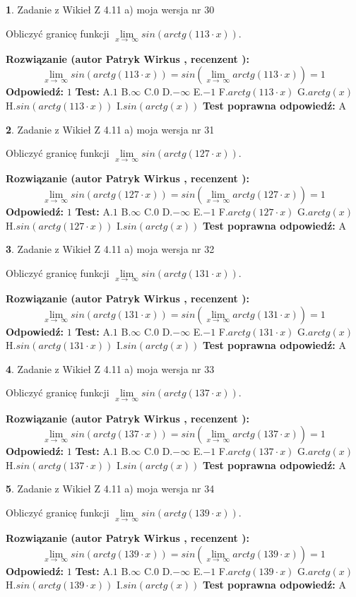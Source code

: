\documentclass[12pt, a4paper]{article}
\theoremstyle{definition} %
\newtheorem{zad}{}
\newcommand{\zadStart}[1]{\begin{zad}#1\newline}
\newcommand{\zadStop}{\end{zad}}
\newcommand{\rozwStart}[2]{\noindent \textbf{Rozwiązanie (autor #1 , recenzent #2): }\newline}
\newcommand{\rozwStop}{\newline}
\newcommand{\odpStart}{\noindent \textbf{Odpowiedź:}\newline}
\newcommand{\odpStop}{\newline}
\newcommand{\testStart}{\noindent \textbf{Test:}\newline}
\newcommand{\testStop}{\newline}
\newcommand{\kluczStart}{\noindent \textbf{Test poprawna odpowiedź:}\newline}
\newcommand{\kluczStop}{\newline}
\begin{document}
\zadStart{Zadanie z Wikieł Z 4.11 a) moja wersja nr 30}

Obliczyć granicę funkcji  $\lim\limits_{x\to\ \infty}sin(arctg(113\cdot x))$.
\zadStop
\rozwStart{Patryk Wirkus}{}
$$\lim\limits_{x\to\ \infty}sin(arctg(113\cdot x)) = sin(\lim\limits_{x\to\ \infty}arctg(113\cdot x)) = 1$$
\rozwStop
\odpStart
$1$
\odpStop
\testStart
A.$1$ B.$\infty$ C.$0$ D.$-\infty$ E.$-1$
F.$arctg(113\cdot x)$ G.$arctg(x)$
H.$sin(arctg(113\cdot x))$
I.$sin(arctg(x))$
\testStop
\kluczStart
A
\kluczStop



\zadStart{Zadanie z Wikieł Z 4.11 a) moja wersja nr 31}

Obliczyć granicę funkcji  $\lim\limits_{x\to\ \infty}sin(arctg(127\cdot x))$.
\zadStop
\rozwStart{Patryk Wirkus}{}
$$\lim\limits_{x\to\ \infty}sin(arctg(127\cdot x)) = sin(\lim\limits_{x\to\ \infty}arctg(127\cdot x)) = 1$$
\rozwStop
\odpStart
$1$
\odpStop
\testStart
A.$1$ B.$\infty$ C.$0$ D.$-\infty$ E.$-1$
F.$arctg(127\cdot x)$ G.$arctg(x)$
H.$sin(arctg(127\cdot x))$
I.$sin(arctg(x))$
\testStop
\kluczStart
A
\kluczStop



\zadStart{Zadanie z Wikieł Z 4.11 a) moja wersja nr 32}

Obliczyć granicę funkcji  $\lim\limits_{x\to\ \infty}sin(arctg(131\cdot x))$.
\zadStop
\rozwStart{Patryk Wirkus}{}
$$\lim\limits_{x\to\ \infty}sin(arctg(131\cdot x)) = sin(\lim\limits_{x\to\ \infty}arctg(131\cdot x)) = 1$$
\rozwStop
\odpStart
$1$
\odpStop
\testStart
A.$1$ B.$\infty$ C.$0$ D.$-\infty$ E.$-1$
F.$arctg(131\cdot x)$ G.$arctg(x)$
H.$sin(arctg(131\cdot x))$
I.$sin(arctg(x))$
\testStop
\kluczStart
A
\kluczStop



\zadStart{Zadanie z Wikieł Z 4.11 a) moja wersja nr 33}

Obliczyć granicę funkcji  $\lim\limits_{x\to\ \infty}sin(arctg(137\cdot x))$.
\zadStop
\rozwStart{Patryk Wirkus}{}
$$\lim\limits_{x\to\ \infty}sin(arctg(137\cdot x)) = sin(\lim\limits_{x\to\ \infty}arctg(137\cdot x)) = 1$$
\rozwStop
\odpStart
$1$
\odpStop
\testStart
A.$1$ B.$\infty$ C.$0$ D.$-\infty$ E.$-1$
F.$arctg(137\cdot x)$ G.$arctg(x)$
H.$sin(arctg(137\cdot x))$
I.$sin(arctg(x))$
\testStop
\kluczStart
A
\kluczStop



\zadStart{Zadanie z Wikieł Z 4.11 a) moja wersja nr 34}

Obliczyć granicę funkcji  $\lim\limits_{x\to\ \infty}sin(arctg(139\cdot x))$.
\zadStop
\rozwStart{Patryk Wirkus}{}
$$\lim\limits_{x\to\ \infty}sin(arctg(139\cdot x)) = sin(\lim\limits_{x\to\ \infty}arctg(139\cdot x)) = 1$$
\rozwStop
\odpStart
$1$
\odpStop
\testStart
A.$1$ B.$\infty$ C.$0$ D.$-\infty$ E.$-1$
F.$arctg(139\cdot x)$ G.$arctg(x)$
H.$sin(arctg(139\cdot x))$
I.$sin(arctg(x))$
\testStop
\kluczStart
A
\kluczStop
\end{document}
